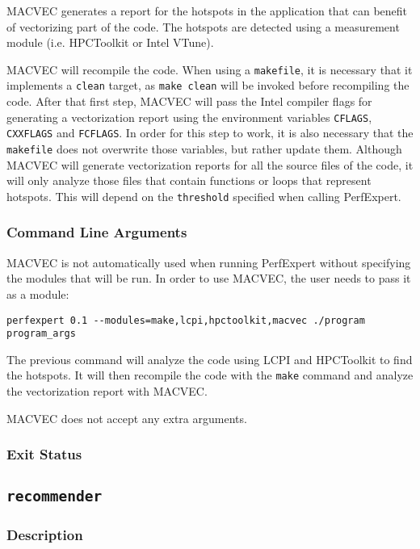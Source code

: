 MACVEC generates a report for the hotspots in the application that can benefit of vectorizing part of the code. The
hotspots are detected using a measurement module (i.e. HPCToolkit or Intel VTune).

MACVEC will recompile the code. When using a \texttt{makefile}, it is necessary that it implements a \texttt{clean}
target, as \texttt{make clean} will be invoked before recompiling the code. After that first step, MACVEC will 
pass the Intel compiler flags for generating a vectorization report using the environment variables \texttt{CFLAGS},
\texttt{CXXFLAGS} and \texttt{FCFLAGS}. In order for this step to work, it is also necessary that the \texttt{makefile}
does not overwrite those variables, but rather update them. Although MACVEC will generate vectorization reports for
all the source files of the code, it will only analyze those files that contain functions or loops that represent
hotspots. This will depend on the \texttt{threshold} specified when calling PerfExpert.


\subsubsection{Command Line Arguments}

MACVEC is not automatically used when running PerfExpert without specifying the modules that will be run.
In order to use MACVEC, the user needs to pass it as a module:

\begin{lstlisting}[breaklines]
perfexpert 0.1 --modules=make,lcpi,hpctoolkit,macvec ./program program_args
\end{lstlisting}

The previous command will analyze the code using LCPI and HPCToolkit to find the hotspots. It will then
recompile the code with the \texttt{make} command and analyze the vectorization report with MACVEC.

MACVEC does not accept any extra arguments.

\subsubsection{Exit Status}

\subsection{\texttt{recommender}}

\subsubsection{Description}

